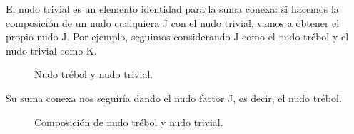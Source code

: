 \documentclass[14pt]{extarticle}
\begin{document}
  
  El nudo trivial es un elemento identidad para la suma conexa: si hacemos la composición de un nudo cualquiera J con el nudo trivial, vamos a obtener el propio nudo J. Por ejemplo, seguimos considerando J como el nudo trébol y el nudo trivial como K. \\
   \begin{figure}[h!]
   	\centering
   	\caption{Nudo trébol y nudo trivial.}
   	\label{comp3} 
   \end{figure}
   
  Su suma conexa nos seguiría dando el nudo factor J, es decir, el nudo trébol.\\
   
      \begin{figure}[h!]
      	\centering
      	\caption{Composición de nudo trébol y nudo trivial.}
      	\label{comp4} 
      \end{figure}
  
\end{document}
